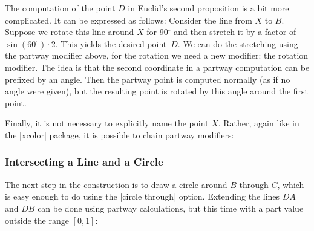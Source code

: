 The computation of the point $D$ in Euclid's second proposition is a bit more
complicated. It can be expressed as follows: Consider the line from $X$ to $B$.
Suppose we rotate this line around $X$ for 90$^\circ$ and then stretch it by a
factor of $\sin(60^\circ) \cdot 2$. This yields the desired point~$D$. We can
do the stretching using the partway modifier above, for the rotation we need a
new modifier: the rotation modifier. The idea is that the second coordinate in
a partway computation can be prefixed by an angle. Then the partway point is
computed normally (as if no angle were given), but the resulting point is
rotated by this angle around the first point.
%
\begin{codeexample}[preamble={\usetikzlibrary{calc}}]
\end{codeexample}

Finally, it is not necessary to explicitly name the point $X$. Rather, again
like in the |xcolor| package, it is possible to chain partway modifiers:
%
\begin{codeexample}[preamble={\usetikzlibrary{calc}}]
\end{codeexample}


\subsubsection{Intersecting a Line and a Circle}

The next step in the construction is to draw a circle around $B$ through $C$,
which is easy enough to do using the |circle through| option. Extending the
lines $DA$ and $DB$ can be done using partway calculations, but this time with
a part value outside the range $[0,1]$:
%
\begin{codeexample}[preamble={\usetikzlibrary{calc,through}}]
\end{codeexample}


